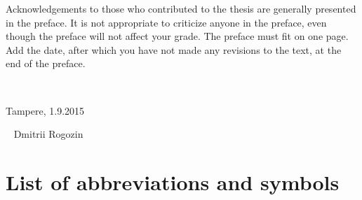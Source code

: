 \documentclass[12pt,a4paper,english%
]{tutthesis}
\begin{document}
Acknowledgements to those who contributed to the thesis are generally
presented in the preface. It is not appropriate to criticize anyone in
the preface, even though the preface will not affect your grade. The
preface must fit on one page. Add the date, after which you have not
made any revisions to the text, at the end of the preface.

~ 

Tampere, 1.9.2015

~
Dmitrii Rogozin
%
%

\renewcommand\contentsname{Table of Contents} %
\setcounter{tocdepth}{3}                      %
\tableofcontents                              %

\renewcommand\listfigurename{List of Figures}  %
\listoffigures                                 %
\markboth{}{}                                  %

\renewcommand\listtablename{List of Tables}    %
\listoftables                                  %
\markboth{}{}                                  %




%
%

\chapter*{List of abbreviations and symbols}
\markboth{}{}                                %
\end{document}
